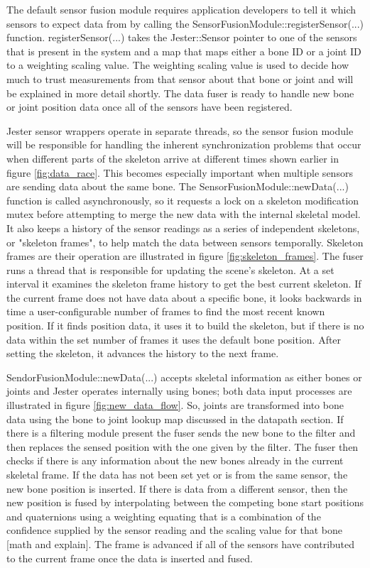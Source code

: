 The default sensor fusion module requires application developers to tell it which sensors to expect data from by calling the SensorFusionModule::registerSensor(...) function. registerSensor(...) takes the Jester::Sensor pointer to one of the sensors that is present in the system and a map that maps either a bone ID or a joint ID to a weighting scaling value. The weighting scaling value is used to decide how much to trust measurements from that sensor about that bone or joint and will be explained in more detail shortly. The data fuser is ready to handle new bone or joint position data once all of the sensors have been registered.

Jester sensor wrappers operate in separate threads, so the sensor fusion module will be responsible for handling the inherent synchronization problems that occur when different parts of the skeleton arrive at different times shown earlier in figure \ref{fig:data_race}. This becomes especially important when multiple sensors are sending data about the same bone. The SensorFusionModule::newData(...) function is called asynchronously, so it requests a lock on a skeleton modification mutex before attempting to merge the new data with the internal skeletal model. It also keeps a history of the sensor readings as a series of independent skeletons, or "skeleton frames", to help match the data between sensors temporally. Skeleton frames are their operation are illustrated in figure \ref{fig:skeleton_frames}. The fuser runs a thread that is responsible for updating the scene's skeleton. At a set interval it examines the skeleton frame history to get the best current skeleton. If the current frame does not have data about a specific bone, it looks backwards in time a user-configurable number of frames to find the most recent known position. If it finds position data, it uses it to build the skeleton, but if there is no data within the set number of frames it uses the default bone position. After setting the skeleton, it advances the history to the next frame. 

SendorFusionModule::newData(...) accepts skeletal information as either bones or joints and Jester operates internally using bones; both data input processes are illustrated in figure \ref{fig:new_data_flow}. So, joints are transformed into bone data using the bone to joint lookup map discussed in the datapath section. If there is a filtering module present the fuser sends the new bone to the filter and then replaces the sensed position with the one given by the filter. The fuser then checks if there is any information about the new bones already in the current skeletal frame. If the data has not been set yet or is from the same sensor, the new bone position is inserted. If there is data from a different sensor, then the new position is fused by interpolating between the competing bone start positions and quaternions using a weighting equating that is a combination of the confidence supplied by the sensor reading and the scaling value for that bone [math and explain]. The frame is advanced if all of the sensors have contributed to the current frame once the data is inserted and fused. 


